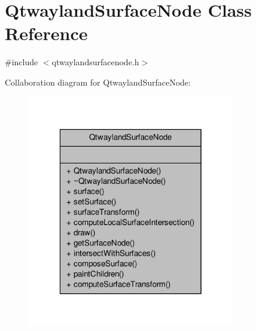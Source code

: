 \hypertarget{classQtwaylandSurfaceNode}{\section{Qtwayland\-Surface\-Node Class Reference}
\label{classQtwaylandSurfaceNode}
}


{\ttfamily \#include $<$qtwaylandsurfacenode.\-h$>$}



Collaboration diagram for Qtwayland\-Surface\-Node\-:
\nopagebreak
\begin{figure}[H]
\begin{center}
\leavevmode
\includegraphics[width=256pt]{classQtwaylandSurfaceNode__coll__graph}
\end{center}
\end{figure}
